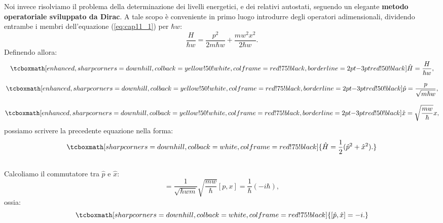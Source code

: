 \documentclass[a4paper,12pt,oneside]{book}
\begin{document}
Noi invece risolviamo il problema della determinazione dei livelli energetici, e dei relativi autostati, seguendo un elegante \textbf{metodo operatoriale sviluppato da Dirac}. A tale scopo è conveniente in primo luogo introdurre degli operatori adimensionali, dividendo entrambe i membri dell'equazione (\ref{eq:cap11_1}) per $\hbar w$:
	\begin{equation} \label{eq:cap11_2}
		\frac{H}{\hbar w}=\frac{p^2}{2m\hbar w}+\frac{mw^2x^2}{2\hbar w}.
	\end{equation}
Definendo allora:
	\begin{gather}  
		\tcboxmath[enhanced, sharp corners=downhill, colback=yellow!50!white, colframe=red!75!black, borderline={2pt}{-3pt}{red!50!black}]{	
			\hat{H}=\frac{H}{\hbar w},
			}  \\[0.3cm]
		\tcboxmath[enhanced, sharp corners=downhill, colback=yellow!50!white, colframe=red!75!black, borderline={2pt}{-3pt}{red!50!black}]{
			 \hat{p}=\frac{p}{\sqrt{m \hbar w }},
			}  \\[0.3cm]
		\tcboxmath[enhanced, sharp corners=downhill, colback=yellow!50!white, colframe=red!75!black, borderline={2pt}{-3pt}{red!50!black}]{
			 \hat{x}= \sqrt{\frac{mw}{\hbar}}x,
			}
	\end{gather}
possiamo scrivere la precedente equazione nella forma:
	\begin{equation}
		\tcboxmath[sharp corners=downhill, colback=white, colframe=red!75!black]{
			\hat{H}=\frac{1}{2} (\hat{p}^2+\hat{x}^2).
			}
	\end{equation}\\
	 
Calcoliamo il commutatore tra $\hat{p}$ e $\hat{x}$:
	\begin{equation}
		[\hat{p},\hat{x}]= \frac{1}{\sqrt{\hbar w m}} \sqrt{\frac{mw}{\hbar}} [p,x]=\frac{1}{\hbar}(-i\hbar),
	\end{equation}
ossia:
	\begin{equation}
	\label{eq:cap11_3}
	 	\tcboxmath[sharp corners=downhill, colback=white, colframe=red!75!black]{
			[\hat{p},\hat{x}]=-i.
			}
	\end{equation}\\
	
\end{document}
